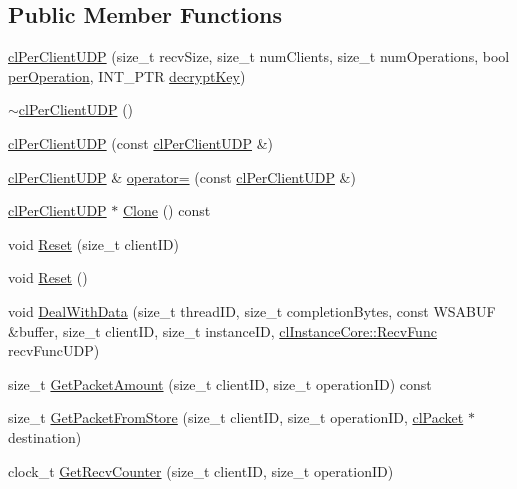 \subsection*{Public Member Functions}
\begin{DoxyCompactItemize}
\item 
\hyperlink{classcl_per_client_u_d_p_a01f4f49f8c3aefd4a88f891b8346815c}{clPerClientUDP} (size\_\-t recvSize, size\_\-t numClients, size\_\-t numOperations, bool \hyperlink{classcl_per_client_u_d_p_ae270ad0657e279032f9e1bebee3f0698}{perOperation}, INT\_\-PTR \hyperlink{classcl_per_client_u_d_p_a997243e373a1d997f27b111d06cccd90}{decryptKey})
\item 
\hyperlink{classcl_per_client_u_d_p_ab08cd50d1dda3900f42d99e15093deeb}{$\sim$clPerClientUDP} ()
\item 
\hyperlink{classcl_per_client_u_d_p_abebbec5f47158b191db9108b824ab31d}{clPerClientUDP} (const \hyperlink{classcl_per_client_u_d_p}{clPerClientUDP} \&)
\item 
\hyperlink{classcl_per_client_u_d_p}{clPerClientUDP} \& \hyperlink{classcl_per_client_u_d_p_a8401c5217b43d904b053e0fbcb0fa462}{operator=} (const \hyperlink{classcl_per_client_u_d_p}{clPerClientUDP} \&)
\item 
\hyperlink{classcl_per_client_u_d_p}{clPerClientUDP} $\ast$ \hyperlink{classcl_per_client_u_d_p_a927ff441992e605aaa5caf2bcb0a19b6}{Clone} () const 
\item 
void \hyperlink{classcl_per_client_u_d_p_ae7d279662aacd52fae6d64683820e653}{Reset} (size\_\-t clientID)
\item 
void \hyperlink{classcl_per_client_u_d_p_a650dc543709d94ea2826871a15e526f5}{Reset} ()
\item 
void \hyperlink{classcl_per_client_u_d_p_acf380c1466abb6941edb950801d09b20}{DealWithData} (size\_\-t threadID, size\_\-t completionBytes, const WSABUF \&buffer, size\_\-t clientID, size\_\-t instanceID, \hyperlink{classcl_instance_core_afa96c2a2c0b26b6a9256b87798bf9587}{clInstanceCore::RecvFunc} recvFuncUDP)
\item 
size\_\-t \hyperlink{classcl_per_client_u_d_p_ad56e31637dfbb161912701621da7ecf6}{GetPacketAmount} (size\_\-t clientID, size\_\-t operationID) const 
\item 
size\_\-t \hyperlink{classcl_per_client_u_d_p_ae5adb603508d2a61d53b95c48b077e73}{GetPacketFromStore} (size\_\-t clientID, size\_\-t operationID, \hyperlink{classcl_packet}{clPacket} $\ast$destination)
\item 
clock\_\-t \hyperlink{classcl_per_client_u_d_p_a1b94d67fd8a10170e31f9b65c4901b0d}{GetRecvCounter} (size\_\-t clientID, size\_\-t operationID)

\end{DoxyCompactItemize}
